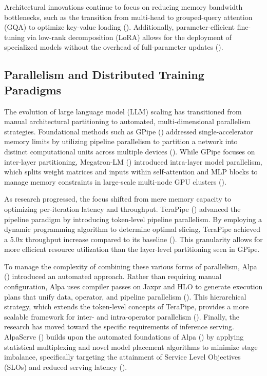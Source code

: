 \documentclass[11pt]{article}
\begin{document}
Architectural innovations continue to focus on reducing memory bandwidth bottlenecks, such as the transition from multi-head to grouped-query attention (GQA) to optimize key-value loading (\citep{2305.13245}). Additionally, parameter-efficient fine-tuning via low-rank decomposition (LoRA) allows for the deployment of specialized models without the overhead of full-parameter updates (\citep{2106.09685}).
\subsection{Parallelism and Distributed Training Paradigms}

The evolution of large language model (LLM) scaling has transitioned from manual architectural partitioning to automated, multi-dimensional parallelism strategies. Foundational methods such as GPipe (\citep{1811.06965}) addressed single-accelerator memory limits by utilizing pipeline parallelism to partition a network into distinct computational units across multiple devices (\citep{1811.06965}). While GPipe focuses on inter-layer partitioning, Megatron-LM (\citep{1909.08053}) introduced intra-layer model parallelism, which splits weight matrices and inputs within self-attention and MLP blocks to manage memory constraints in large-scale multi-node GPU clusters (\citep{1909.08053}).

As research progressed, the focus shifted from mere memory capacity to optimizing per-iteration latency and throughput. TeraPipe (\citep{2102.07988}) advanced the pipeline paradigm by introducing token-level pipeline parallelism. By employing a dynamic programming algorithm to determine optimal slicing, TeraPipe achieved a 5.0x throughput increase compared to its baseline (\citep{2102.07988}). This granularity allows for more efficient resource utilization than the layer-level partitioning seen in GPipe.

To manage the complexity of combining these various forms of parallelism, Alpa (\citep{2201.12023}) introduced an automated approach. Rather than requiring manual configuration, Alpa uses compiler passes on Jaxpr and HLO to generate execution plans that unify data, operator, and pipeline parallelism (\citep{2201.12023}). This hierarchical strategy, which extends the token-level concepts of TeraPipe, provides a more scalable framework for inter- and intra-operator parallelism (\citep{2201.12023}). Finally, the research has moved toward the specific requirements of inference serving. AlpaServe (\citep{2302.11665}) builds upon the automated foundations of Alpa (\citep{2201.12023}) by applying statistical multiplexing and novel model placement algorithms to minimize stage imbalance, specifically targeting the attainment of Service Level Objectives (SLOs) and reduced serving latency (\citep{2302.11665}).
\end{document}
